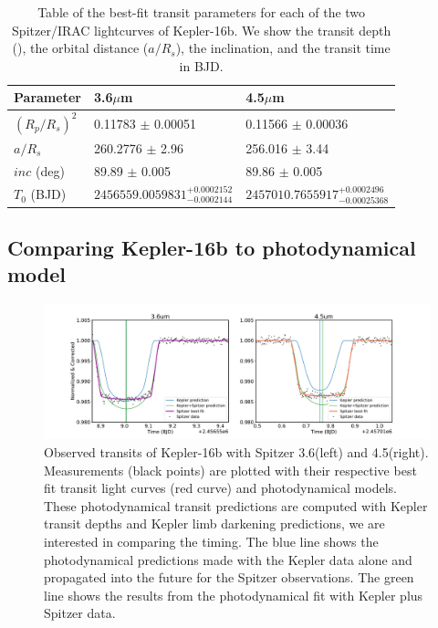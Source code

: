 \begin{table}
    \caption{Table of the best-fit transit parameters for each of the two Spitzer/IRAC lightcurves of Kepler-16b. We show the transit depth (\rprss), the orbital distance ($a/R_s$), the inclination, and the transit time in BJD.}

    \centering
    \begin{tabular}{lll}
    \hline \hline
    Parameter & 3.6$\mu$m & 4.5$\mu$m \\
    \hline
    $(R_p/R_s)^2$ &  0.11783 $\pm$ 0.00051 & 0.11566 $\pm$ 0.00036 \\
    $a/R_s$ & 260.2776 $\pm$ 2.96 & 256.016 $\pm$ 3.44   \\
    $inc$ (deg)  & 89.89 $\pm$ 0.005 & 89.86 $\pm$ 0.005 \\
    $T_0$ (BJD) &  $2456559.0059831^{+0.0002152}_{-0.0002144}$ &  $2457010.7655917^{+0.0002496}_{-0.00025368}$ \\
    \hline
    \end{tabular}
    \label{P4:tab:spitzerresults}
\end{table}

\subsection{Comparing Kepler-16b to photodynamical model}


\begin{figure}
    \centering
    \includegraphics[trim={3cm 0 3cm 0},clip, width=\linewidth]{Kepler16b_bestfit+pred+data.pdf}
    \caption{Observed transits of Kepler-16b with Spitzer 3.6\um (left) and 4.5\um (right). Measurements (black points) are plotted with their respective best fit transit light curves (red curve) and photodynamical models. These photodynamical transit predictions are computed with Kepler transit depths and Kepler limb darkening predictions, we are interested in comparing the timing. The blue line shows the photodynamical predictions made with the Kepler data alone and propagated into the future for the Spitzer observations. The green line shows the results from the photodynamical fit with Kepler plus Spitzer data. }
    \label{P4:fig:K16_photo}
\end{figure}

